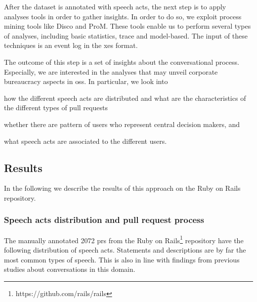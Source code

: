 After the dataset is annotated with speech acts, the next step is to apply analyses tools in order to gather insights. 
In order to do so, we exploit process mining tools like Disco and ProM. These tools enable us to perform several types of analyses, including basic statistics, trace and model-based. The input of these techniques is an event log in the \gls{xes} format. 

The outcome of this step is a set of insights about the conversational process. Especially, we are interested in the analyses that may unveil corporate bureaucracy aspects in \gls{oss}. In particular, we look into 
\begin{inparaenum}[\itshape i)]
	\item how the different speech acts are distributed and what are the characteristics of the different types of pull requests
	\item whether there are pattern of users who represent central decision makers, and
	\item what speech acts are associated to the different users.
\end{inparaenum}



\subsection{Results}

In the following we describe the results of this approach on the Ruby on Rails repository. 

\subsubsection{Speech acts distribution and pull request process}

The manually annotated 2072 \glspl{pr} from the Ruby on Rails\footnote{https://github.com/rails/rails} repository have the following distribution of speech acts. Statements and descriptions are by far the most common types of speech. This is also in line with findings from previous studies \citep{DBLP:journals/cscw/RipocheS06,DBLP:conf/sigsoft/WoodRAM18} about conversations in this domain. 

